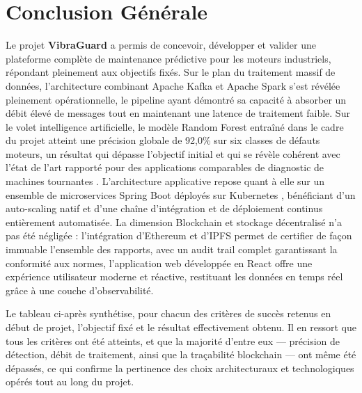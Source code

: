 \documentclass[12pt, a4paper, oneside]{report}
\newcommand{\projectname}{\textbf{VibraGuard}}
\begin{document}
\chapter*{Conclusion Générale}

Le projet \projectname{} a permis de concevoir, développer et valider une plateforme complète
de maintenance prédictive pour les moteurs industriels, répondant pleinement aux objectifs fixés.
Sur le plan du traitement massif de données, l'architecture combinant Apache Kafka \cite{kafka}
et Apache Spark \cite{spark} s'est révélée pleinement opérationnelle, le pipeline ayant démontré
sa capacité à absorber un débit élevé de messages tout en maintenant une
latence de traitement faible. Sur le volet intelligence artificielle, le modèle
Random Forest \cite{breiman2001} entraîné dans le cadre du projet atteint une précision globale
de 92,0\% sur six classes de défauts moteurs, un résultat qui dépasse l'objectif initial
et qui se révèle cohérent avec l'état de l'art rapporté pour des applications comparables de
diagnostic de machines tournantes \cite{lei2020}. L'architecture applicative repose quant à elle
sur un ensemble de microservices Spring Boot \cite{springboot} déployés sur Kubernetes
\cite{kubernetes}, bénéficiant d'un auto-scaling natif et d'une chaîne d'intégration et de
déploiement continus entièrement automatisée. La dimension Blockchain et stockage décentralisé
n'a pas été négligée : l'intégration d'Ethereum et d'IPFS \cite{ethereum, ipfs} permet de certifier
de façon immuable l'ensemble des rapports, avec un audit trail complet garantissant
la conformité aux normes,
l'application web développée en React \cite{react} offre une expérience utilisateur moderne et
réactive, restituant les données en temps réel grâce à une couche d'observabilité.

Le tableau ci-après synthétise, pour chacun des critères de succès retenus en début de projet,
l'objectif fixé et le résultat effectivement obtenu. Il en ressort que tous les critères ont été
atteints, et que la majorité d'entre eux --- précision de détection, débit de traitement, ainsi
que la traçabilité blockchain --- ont même été dépassés, ce qui confirme la pertinence des choix
architecturaux et technologiques opérés tout au long du projet.
\end{document}
